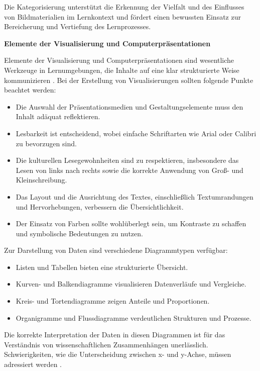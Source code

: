 Die Kategorisierung unterstützt die Erkennung der Vielfalt und des Einflusses von Bildmaterialien im Lernkontext und fördert einen bewussten Einsatz zur Bereicherung und Vertiefung des Lernprozesses.

\textbf{Elemente der Visualisierung und Computerpräsentationen}

Elemente der Visualisierung und Computerpräsentationen sind wesentliche Werkzeuge in Lernumgebungen, die Inhalte auf eine klar strukturierte Weise kommunizieren \cite{Bilek2007}. Bei der Erstellung von Visualisierungen sollten folgende Punkte beachtet werden:

\begin{itemize}
	\item Die Auswahl der Präsentationsmedien und Gestaltungselemente muss den Inhalt adäquat reflektieren.
	\item Lesbarkeit ist entscheidend, wobei einfache Schriftarten wie Arial oder Calibri zu bevorzugen sind.
	\item Die kulturellen Lesegewohnheiten sind zu respektieren, insbesondere das Lesen von links nach rechts sowie die korrekte Anwendung von Groß- und Kleinschreibung.
	\item Das Layout und die Ausrichtung des Textes, einschließlich Textumrandungen und Hervorhebungen, verbessern die Übersichtlichkeit.
	\item Der Einsatz von Farben sollte wohlüberlegt sein, um Kontraste zu schaffen und symbolische Bedeutungen zu nutzen.
\end{itemize}

Zur Darstellung von Daten sind verschiedene Diagrammtypen verfügbar:

\begin{itemize}
	\item Listen und Tabellen bieten eine strukturierte Übersicht.
	\item Kurven- und Balkendiagramme visualisieren Datenverläufe und Vergleiche.
	\item Kreis- und Tortendiagramme zeigen Anteile und Proportionen.
	\item Organigramme und Flussdiagramme verdeutlichen Strukturen und Prozesse.
\end{itemize}

Die korrekte Interpretation der Daten in diesen Diagrammen ist für das Verständnis von wissenschaftlichen Zusammenhängen unerlässlich. Schwierigkeiten, wie die Unterscheidung zwischen x- und y-Achse, müssen adressiert werden \cite{Happonen2011}.

